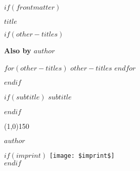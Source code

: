 \documentclass[$if(fontsize)$$fontsize$,$endif$$if(lang)$$babel-lang$,$endif$$if(papersize)$$papersize$paper,$endif$$if(beamer)$ignorenonframetext,$if(handout)$handout,$endif$$if(aspectratio)$aspectratio=$aspectratio$,$endif$$endif$$for(classoption)$$classoption$$sep$,$endfor$]{$documentclass$}
\begin{document}
  \sloppy %
  \setcounter{page}{1}
$if(frontmatter)$
  \pagestyle{empty}
  \begin{center}
    \vspace*{\fill}

    \LARGE\textbf{\textsf{$title$}}

    \vspace*{\fill}
    \vspace*{\fill}
  \end{center}
  \clearpage

  \newpage
  \emph{ }\newline
  $if(other-titles)$
    \begin{center}
      \textbf{Also by $author$}

      $for(other-titles)$
      $other-titles$\newline
      $endfor$
    \end{center}
  $endif$
  \clearpage

  \begin{center}
    \vspace*{\fill}

    \ttfamily{\Huge\color{blue}{$title$}}

    $if(subtitle)$
    \vspace*{0.125in}
    {\centering
     \Large\textbf{\textsf{$subtitle$}}
    }


    $endif$

    \vspace*{0.25in}
    \line(1,0){150}
    \vspace*{0.25in}

    \Large\textsf{$author$}

    \vspace*{\fill}
    \vspace*{\fill}
    $if(imprint)$
    \texttt{[image: \$imprint\$]}\\[0cm]
    \vspace*{0.25in}
    $endif$
  \end{center}
  \clearpage
\end{document}
